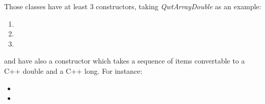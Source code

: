\documentclass[a4paper,10pt,english]{manual}
\begin{document}
Those classes have at least 3 constructors, taking \emph{QwtArrayDouble} as an
example:
\begin{enumerate}
\item {} 

\item {} 

\item {} 

\end{enumerate}

 and  have also a constructor which takes a
sequence of items convertable to a C++ double and a C++ long.
For instance:
\begin{itemize}
\item {} 

\item {} 

\end{itemize}
\end{document}
